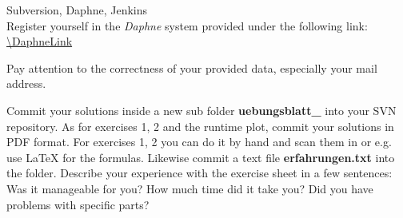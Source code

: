  Subversion, Daphne, Jenkins \\
Register yourself in the \textit{Daphne} system provided under the following
link:\\
\url{\DaphneLink}

Pay attention to the correctness of your provided data, especially your mail
address.

Commit your solutions inside a new sub folder
\textbf{uebungsblatt\_\ExerciseSheetNumber} into your SVN repository.
As for exercises 1, 2 and the runtime plot,
commit your solutions in PDF format.
For exercises 1, 2 you can do it by hand and scan them in or e.g. use LaTeX
for the formulas.
Likewise commit a text file \textbf{erfahrungen.txt} into the folder.
Describe your experience with the exercise sheet in a few sentences:
Was it manageable for you?
How much time did it take you?
Did you have problems with specific parts?